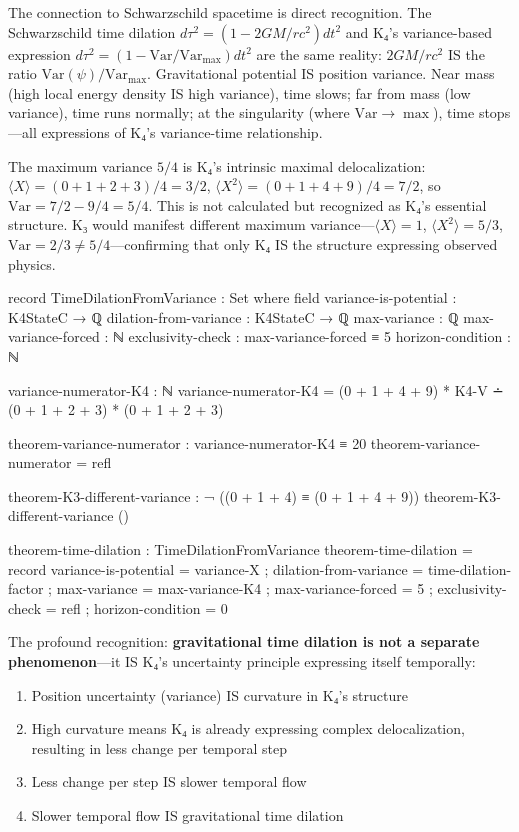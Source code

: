 \documentclass[11pt,a4paper]{book}
\begin{document}
The connection to Schwarzschild spacetime is direct recognition. The Schwarzschild time dilation $d\tau^2 = (1 - 2GM/rc^2) dt^2$ and K₄'s variance-based expression $d\tau^2 = (1 - \text{Var}/\text{Var}_{\max}) dt^2$ are the same reality: $2GM/rc^2$ IS the ratio $\text{Var}(\psi)/\text{Var}_{\max}$. Gravitational potential IS position variance. Near mass (high local energy density IS high variance), time slows; far from mass (low variance), time runs normally; at the singularity (where $\text{Var} \to \max$), time stops—all expressions of K₄'s variance-time relationship.

The maximum variance $5/4$ is K₄'s intrinsic maximal delocalization: $\langle X\rangle = (0+1+2+3)/4 = 3/2$, $\langle X^2\rangle = (0+1+4+9)/4 = 7/2$, so $\text{Var} = 7/2 - 9/4 = 5/4$. This is not calculated but recognized as K₄'s essential structure. K₃ would manifest different maximum variance—$\langle X\rangle = 1$, $\langle X^2\rangle = 5/3$, $\text{Var} = 2/3 \neq 5/4$—confirming that only K₄ IS the structure expressing observed physics.

\begin{code}
record TimeDilationFromVariance : Set where
  field
    variance-is-potential : K4StateC → ℚ
    dilation-from-variance : K4StateC → ℚ
    max-variance : ℚ
    max-variance-forced : ℕ
    exclusivity-check : max-variance-forced ≡ 5
    horizon-condition : ℕ

variance-numerator-K4 : ℕ
variance-numerator-K4 = (0 + 1 + 4 + 9) * K4-V ∸ (0 + 1 + 2 + 3) * (0 + 1 + 2 + 3)

theorem-variance-numerator : variance-numerator-K4 ≡ 20
theorem-variance-numerator = refl

theorem-K3-different-variance : ¬ ((0 + 1 + 4) ≡ (0 + 1 + 4 + 9))
theorem-K3-different-variance ()

theorem-time-dilation : TimeDilationFromVariance
theorem-time-dilation = record
  { variance-is-potential = variance-X
  ; dilation-from-variance = time-dilation-factor
  ; max-variance = max-variance-K4
  ; max-variance-forced = 5
  ; exclusivity-check = refl
  ; horizon-condition = 0
  }
\end{code}

The profound recognition: \textbf{gravitational time dilation is not a separate phenomenon}—it IS K₄'s uncertainty principle expressing itself temporally:

\begin{enumerate}
\item Position uncertainty (variance) IS curvature in K₄'s structure
\item High curvature means K₄ is already expressing complex delocalization, resulting in less change per temporal step
\item Less change per step IS slower temporal flow
\item Slower temporal flow IS gravitational time dilation
\end{enumerate}
\end{document}
